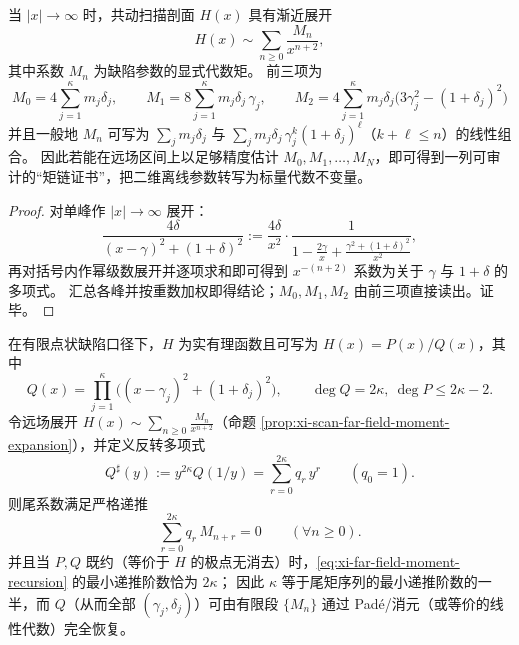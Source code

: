 \begin{proposition}\label{prop:xi-scan-far-field-moment-expansion}
当 \(|x|\to\infty\) 时，共动扫描剖面 \(H(x)\) 具有渐近展开
\[
H(x)\sim \sum_{n\ge 0}\frac{M_n}{x^{n+2}},
\]
其中系数 \(M_n\) 为缺陷参数的显式代数矩。
前三项为
\[
\boxed{\;
M_0=4\sum_{j=1}^{\kappa}m_j\delta_j,\qquad
M_1=8\sum_{j=1}^{\kappa}m_j\delta_j\,\gamma_j,\qquad
M_2=4\sum_{j=1}^{\kappa}m_j\delta_j\bigl(3\gamma_j^2-(1+\delta_j)^2\bigr)\;}
\]
并且一般地 \(M_n\) 可写为 \(\sum_j m_j\delta_j\) 与 \(\sum_j m_j\delta_j\,\gamma_j^k(1+\delta_j)^\ell\)（\(k+\ell\le n\)）的线性组合。
因此若能在远场区间上以足够精度估计 \(M_0,M_1,\dots,M_{N}\)，即可得到一列可审计的“矩链证书”，把二维离线参数转写为标量代数不变量。
\end{proposition}

\begin{proof}
对单峰作 \(|x|\to\infty\) 展开：
\[
\frac{4\delta}{(x-\gamma)^2+(1+\delta)^2}
:=\frac{4\delta}{x^2}\cdot\frac{1}{1-\frac{2\gamma}{x}+\frac{\gamma^2+(1+\delta)^2}{x^2}},
\]
再对括号内作幂级数展开并逐项求和即可得到 \(x^{-(n+2)}\) 系数为关于 \(\gamma\) 与 \(1+\delta\) 的多项式。
汇总各峰并按重数加权即得结论；\(M_0,M_1,M_2\) 由前三项直接读出。证毕。
\end{proof}

\begin{proposition}\label{prop:xi-far-field-moment-recursion-order-2kappa}
在有限点状缺陷口径下，\(H\) 为实有理函数且可写为 \(H(x)=P(x)/Q(x)\)，其中
\[
Q(x)=\prod_{j=1}^{\kappa}\bigl((x-\gamma_j)^2+(1+\delta_j)^2\bigr),
\qquad \deg Q=2\kappa,\ \deg P\le 2\kappa-2.
\]
令远场展开 \(H(x)\sim\sum_{n\ge 0}\frac{M_n}{x^{n+2}}\)（命题 \ref{prop:xi-scan-far-field-moment-expansion}），并定义反转多项式
\begin{equation}\label{eq:xi-Qsharp-from-Q}
\boxed{\;
Q^\sharp(y):=y^{2\kappa}Q(1/y)=\sum_{r=0}^{2\kappa}q_r\,y^{r}\qquad(q_0=1).\;}
\end{equation}
则尾系数满足严格递推
\begin{equation}\label{eq:xi-far-field-moment-recursion}
\boxed{\;
\sum_{r=0}^{2\kappa} q_r\,M_{n+r}=0\qquad(\forall n\ge 0).\;}
\end{equation}
并且当 \(P,Q\) 既约（等价于 \(H\) 的极点无消去）时，\eqref{eq:xi-far-field-moment-recursion} 的最小递推阶数恰为 \(2\kappa\)；
因此 \(\kappa\) 等于尾矩序列的最小递推阶数的一半，而 \(Q\)（从而全部 \((\gamma_j,\delta_j)\)）可由有限段 \(\{M_n\}\) 通过 Pad\'e/消元（或等价的线性代数）完全恢复。
\end{proposition}

